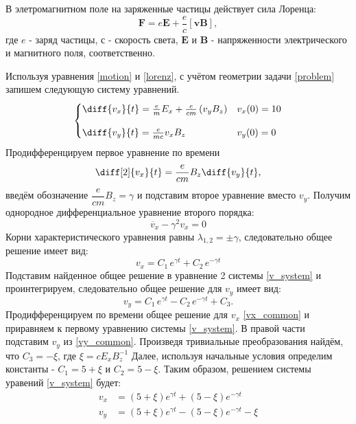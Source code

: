 \documentclass[a4paper]{article}
\begin{document}
В элетромагнитном поле на заряженные частицы действует сила Лоренца:
\begin{equation}\label{lorenz}
\mathbf{F} = e \mathbf{E} + \frac{e}{c}\left[\mathbf{vB}\right],
\end{equation}
где $e$ - заряд частицы, $с$ - скорость света, $\mathbf{E}$ и $\mathbf{B}$ - напряженности электрического и магнитного поля, соответственно.

Используя уравнения \eqref{motion} и \eqref{lorenz}, с учётом геометрии задачи \ref{problem} запишем следующую систему уравнений.
\begin{equation}\label{v_system}
\begin{cases}
\diff{v_x}{t} = \frac{e}{m}E_x + \frac{e}{cm}\left(v_yB_z\right)	& 	v_x(0) = 10 \\[10pt]
\diff{v_y}{t} = \frac{e}{mc} v_x B_z					&	v_y(0) = 0 \\
\end{cases}
\end{equation}
Продифференцируем первое уравнение по времени
\[
\diff[2]{v_x}{t} =\frac{e}{cm} B_z \diff{v_y}{t},
\]
введём обозначение $\dfrac{e}{cm}B_z = \gamma$ и подставим второе уравнение вместо $v_y$. Получим однородное дифференциальное уравнение второго порядка:
\[
\ddot{v_x} - \gamma^2 v_x = 0		
\]
Корни характеристического уравнения равны $\lambda_{1,2} = \pm \gamma$, следовательно общее решение имеет вид:
\begin{equation}\label{vx_common}
v_x = C_1\, e^{\gamma t} + C_2\, e^{-\gamma t}
\end{equation}
Подставим найденное общее решение в уравнение 2 системы \eqref{v_system} и проинтегрируем, следовательно общее решение для $v_y$ имеет вид:
\begin{equation}\label{vy_common}
v_y = C_1 \, e^{\gamma t} - C_2 \, e^{-\gamma t} + C_3 .
\end{equation}
Продифференцируем по времени общее решение для $v_x$ \eqref{vx_common} и приравняем к первому уравнению системы \eqref{v_system}. В правой части подставим $v_y$ из \eqref{vy_common}. Произведя тривиальные преобразования найдём, что $C_3 = -\xi$, где $\xi = cE_xB_z^{-1}$ Далее, используя начальные условия определим константы - $C_1 = 5 + \xi$ и $C_2 = 5 - \xi$. Таким образом, решением системы уравений \eqref{v_system} будет:
\begin{align}\label{analytic}
v_x &= (5 + \xi)e^{\gamma t} + (5 - \xi)e^{-\gamma t} \\
v_y &= (5 + \xi)e^{\gamma t} - (5 - \xi)e^{-\gamma t} -\xi 
\end{align}
\end{document}
